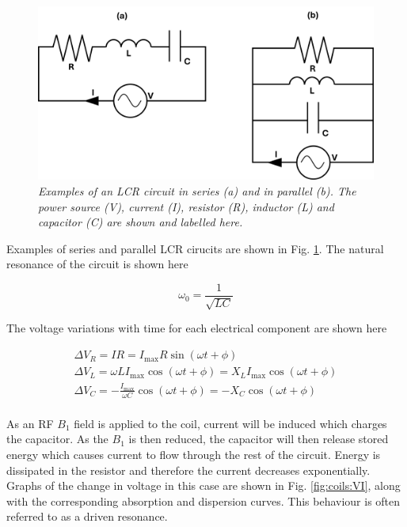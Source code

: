 \begin{figure}
    \centering
    \includegraphics[width=0.9\linewidth]{Figures/Coils/RLC_Circuit.png}
    \caption{\textit{Examples of an LCR circuit in series (a) and in parallel (b). The power source (V), current (I), resistor (R), inductor (L) and capacitor (C) are shown and labelled here.}}
    \label{fig:coils:RLC}
\end{figure}

Examples of series and parallel LCR cirucits are shown in Fig. \ref{fig:coils:RLC}. The natural resonance of the circuit is shown here

\begin{equation}
    \omega_0 = \frac{1}{\sqrt{LC}}
    \label{eqn:coils:res}
\end{equation}

The voltage variations with time for each electrical component are shown here 

\begin{equation}
\begin{gathered}
    \Delta V_R = IR = I_{\mathrm{max}}R\sin(\omega t + \phi) \\
    \Delta V_L = \omega LI_{\mathrm{max}}\cos(\omega t + \phi) =  X_LI_{\mathrm{max}}\cos(\omega t + \phi)\\
    \Delta V_C = -\frac{I_{\mathrm{max}}}{\omega C}\cos(\omega t + \phi) = -X_C\cos(\omega t + \phi)\\
    \label{eqn:coils:Voltage}
\end{gathered}
\end{equation}

As an \ac{RF} $B_1$ field is applied to the coil, current will be induced which charges the capacitor. As the $B_1$ is then reduced, the capacitor will then release stored energy which causes current to flow through the rest of the circuit. Energy is dissipated in the resistor and therefore the current decreases exponentially. Graphs of the change in voltage in this case are shown in Fig. \ref{fig:coils:VI}, along with the corresponding absorption and dispersion curves. This behaviour is often referred to as a driven resonance.

